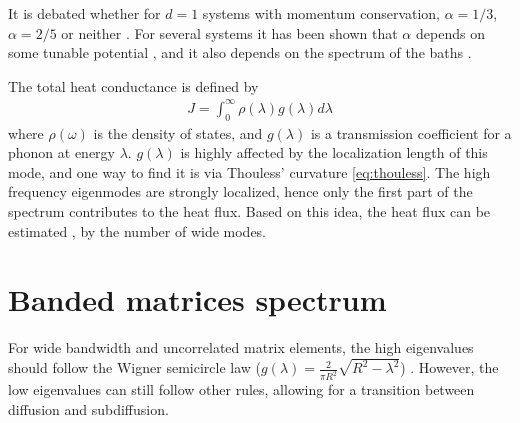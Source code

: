 It is debated whether for $d=1$ systems
with momentum conservation,  $\alpha=1/3$,$\alpha=2/5$ or neither
\cite{narayan_anomalous_2002,delfini_comment_2008,dhar_dhar_2008,wang_power-law_2011}.
For several systems it has been shown that $\alpha$ depends on some tunable potential \cite{tong_wave_1999},
and it also depends on the spectrum of the baths \cite{dhar_heat_2001}.



The total heat conductance is defined by
%
\begin{align}
J = \int_0^\infty \rho(\lambda) g(\lambda) d\lambda
\end{align}
where $\rho(\omega)$ is the density of states, and $g(\lambda)$ is 
a transmission coefficient for a phonon at energy $\lambda$.
$g(\lambda)$ is highly affected by the localization length of this mode, 
and one way to find it is via Thouless' curvature \autoref{eq:thouless}.
The high frequency eigenmodes are strongly localized, hence only the
first part of the spectrum contributes to the heat flux. Based on this idea,
the heat flux can be estimated \cite{lepri_thermal_2001,bodyfelt_unpub},
by the number of wide modes.





 


\section{Banded matrices spectrum}


For wide bandwidth and uncorrelated matrix elements, the high eigenvalues
should follow the Wigner semicircle law ($g(\lambda) = \frac{2}{\pi R^2}\sqrt{R^2-\lambda^2}$)
\cite{erdos_local_2012,fyodorov_scaling_1991,wigner_characteristic_1955}. However,
the low eigenvalues can still follow other rules, allowing for a transition
between diffusion and subdiffusion.











